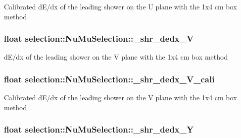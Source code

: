 Calibrated d\-E/dx of the leading shower on the U plane with the 1x4 cm box method \hypertarget{classselection_1_1NuMuSelection_a779a5d2a981609620e58ecb9cc476757}{
\subsubsection[{\-\_\-shr\-\_\-dedx\-\_\-\-V}]{\setlength{\rightskip}{0pt plus 5cm}float selection\-::\-Nu\-Mu\-Selection\-::\-\_\-shr\-\_\-dedx\-\_\-\-V\hspace{0.3cm}{\ttfamily [private]}}}\label{classselection_1_1NuMuSelection_a779a5d2a981609620e58ecb9cc476757}
d\-E/dx of the leading shower on the V plane with the 1x4 cm box method \hypertarget{classselection_1_1NuMuSelection_a74fb79b425a2a1fc35ac9050df2e28e0}{
\subsubsection[{\-\_\-shr\-\_\-dedx\-\_\-\-V\-\_\-cali}]{\setlength{\rightskip}{0pt plus 5cm}float selection\-::\-Nu\-Mu\-Selection\-::\-\_\-shr\-\_\-dedx\-\_\-\-V\-\_\-cali\hspace{0.3cm}{\ttfamily [private]}}}\label{classselection_1_1NuMuSelection_a74fb79b425a2a1fc35ac9050df2e28e0}
Calibrated d\-E/dx of the leading shower on the V plane with the 1x4 cm box method \hypertarget{classselection_1_1NuMuSelection_a94dda0e5c78c02e5787f00ded787f7ab}{
\subsubsection[{\-\_\-shr\-\_\-dedx\-\_\-\-Y}]{\setlength{\rightskip}{0pt plus 5cm}float selection\-::\-Nu\-Mu\-Selection\-::\-\_\-shr\-\_\-dedx\-\_\-\-Y\hspace{0.3cm}{\ttfamily [private]}}}\label{classselection_1_1NuMuSelection_a94dda0e5c78c02e5787f00ded787f7ab}
